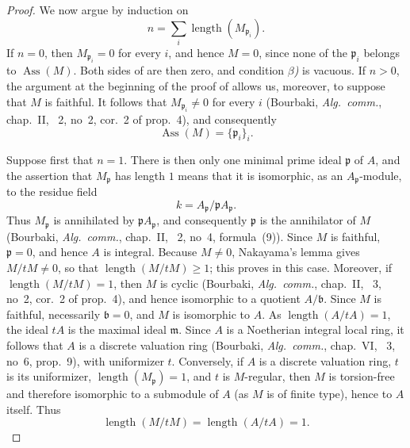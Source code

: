 \begin{proof}
We now argue by induction on
\[
n=\sum_i\operatorname{length}(M_{\mathfrak p_i}).
\]
If $n=0$, then $M_{\mathfrak p_i}=0$ for every $i$, and hence $M=0$, since none of the $\mathfrak p_i$ belongs to $\operatorname{Ass}(M)$.
Both sides of  are then zero, and condition \emph{$\beta$)} is vacuous.
If $n>0$, the argument at the beginning of the proof of  allows us, moreover, to suppose that $M$ is faithful.
It follows that $M_{\mathfrak p_i}\neq 0$ for every $i$ (Bourbaki, \emph{Alg.\ comm.}, chap.~II, \textsection~2, no~2, cor.~2 of prop.~4), and consequently
\[
\operatorname{Ass}(M)=\{\mathfrak p_i\}_i.
\]


Suppose first that $n=1$.
There is then only one minimal prime ideal $\mathfrak p$ of $A$, and the assertion that $M_{\mathfrak p}$ has length $1$ means that it is isomorphic, as an $A_{\mathfrak p}$-module, to the residue field
\[
k=A_{\mathfrak p}/\mathfrak pA_{\mathfrak p}.
\]
Thus $M_{\mathfrak p}$ is annihilated by $\mathfrak pA_{\mathfrak p}$, and consequently $\mathfrak p$ is the annihilator of $M$ (Bourbaki, \emph{Alg.\ comm.}, chap.~II, \textsection~2, no~4, formula~(9)).
Since $M$ is faithful, $\mathfrak p=0$, and hence $A$ is integral.
Because $M\neq 0$, Nakayama's lemma gives $M/tM\neq 0$, so that $\operatorname{length}(M/tM)\geqslant 1$; this proves  in this case.
Moreover, if $\operatorname{length}(M/tM)=1$, then $M$ is cyclic (Bourbaki, \emph{Alg.\ comm.}, chap.~II, \textsection~3, no~2, cor.~2 of prop.~4), and hence isomorphic to a quotient $A/\mathfrak b$.
Since $M$ is faithful, necessarily $\mathfrak b=0$, and $M$ is isomorphic to $A$.
As $\operatorname{length}(A/tA)=1$, the ideal $tA$ is the maximal ideal $\mathfrak m$.
Since $A$ is a Noetherian integral local ring, it follows that $A$ is a discrete valuation ring (Bourbaki, \emph{Alg.\ comm.}, chap.~VI, \textsection~3, no~6, prop.~9), with uniformizer $t$.
Conversely, if $A$ is a discrete valuation ring, $t$ is its uniformizer, $\operatorname{length}(M_{\mathfrak p})=1$, and $t$ is $M$-regular, then $M$ is torsion-free and therefore isomorphic to a submodule of $A$ (as $M$ is of finite type), hence to $A$ itself.
Thus
\[
\operatorname{length}(M/tM)=\operatorname{length}(A/tA)=1.
\]


\end{proof}
